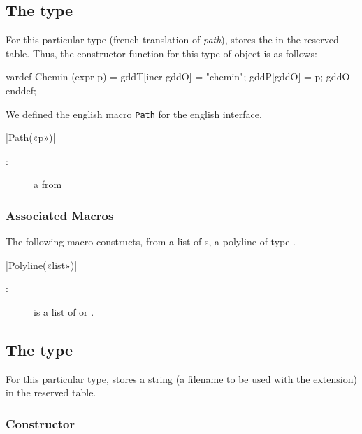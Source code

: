 \documentclass[a4paper,english]{article}
\begin{document}
\subsection{The  type} 

For this particular type (french translation of \emph{path}), \mpgeomdd stores
the  in the reserved  table. Thus, the constructor
function for this type of object is as follows:
\begin{mpcode}
vardef Chemin (expr p) =
gddT[incr gddO] = "chemin"; gddP[gddO] = p; gddO
enddef;
\end{mpcode}
\begin{colourband}

We defined the english macro \lstinline+Path+ for the english interface. 

\macro|Path(«p»)|
\begin{description}
  \item[:] a  from \MP
\end{description}
\end{colourband}


\subsubsection{Associated Macros}

The following macro constructs, from a list of s, a polyline of
type .

\begin{colourband}
  \macro|Polyline(«list»)|
  \begin{description}
    \item[:] is a list of  or .
  \end{description}
\end{colourband}

\subsection{The  type}

For this particular type, \mpgeomdd stores
a string (a filename to be used with the  extension) in the reserved  table.

\subsubsection{Constructor}
\end{document}
